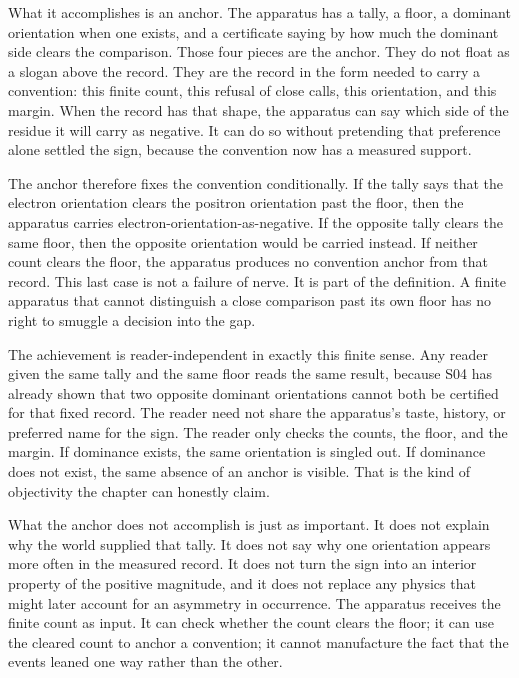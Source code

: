 What it accomplishes is an anchor. The apparatus has a tally, a floor, a
dominant orientation when one exists, and a certificate saying by how much the
dominant side clears the comparison. Those four pieces are the anchor. They do
not float as a slogan above the record. They are the record in the form needed
to carry a convention: this finite count, this refusal of close calls, this
orientation, and this margin. When the record has that shape, the apparatus can
say which side of the residue it will carry as negative. It can do so without
pretending that preference alone settled the sign, because the convention now
has a measured support.

The anchor therefore fixes the convention conditionally. If the tally says that
the electron orientation clears the positron orientation past the floor, then
the apparatus carries electron-orientation-as-negative. If the opposite tally
clears the same floor, then the opposite orientation would be carried instead.
If neither count clears the floor, the apparatus produces no convention anchor
from that record. This last case is not a failure of nerve. It is part of the
definition. A finite apparatus that cannot distinguish a close comparison past
its own floor has no right to smuggle a decision into the gap.

The achievement is reader-independent in exactly this finite sense. Any reader
given the same tally and the same floor reads the same result, because S04 has
already shown that two opposite dominant orientations cannot both be certified
for that fixed record. The reader need not share the apparatus's taste, history,
or preferred name for the sign. The reader only checks the counts, the floor,
and the margin. If dominance exists, the same orientation is singled out. If
dominance does not exist, the same absence of an anchor is visible. That is the
kind of objectivity the chapter can honestly claim.

What the anchor does not accomplish is just as important. It does not explain
why the world supplied that tally. It does not say why one orientation appears
more often in the measured record. It does not turn the sign into an interior
property of the positive magnitude, and it does not replace any physics that
might later account for an asymmetry in occurrence. The apparatus receives the
finite count as input. It can check whether the count clears the floor; it can
use the cleared count to anchor a convention; it cannot manufacture the fact
that the events leaned one way rather than the other.

